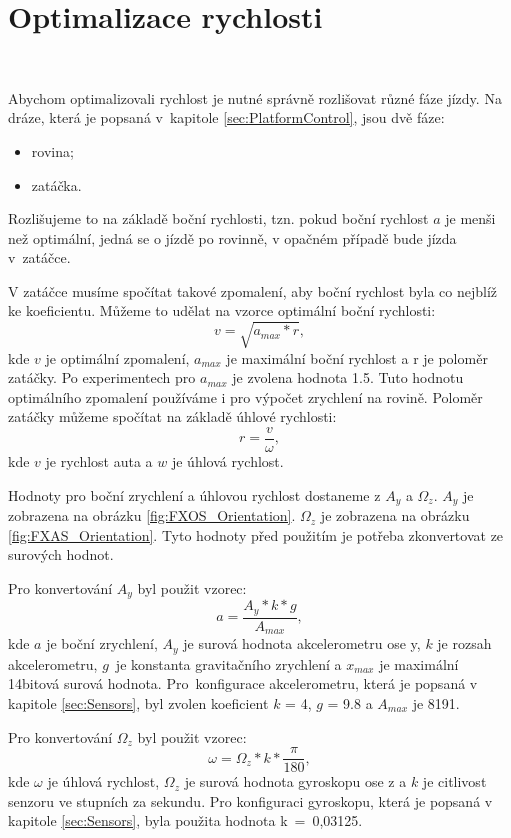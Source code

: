 \chapter{Optimalizace rychlosti}
\label{sec:SpeedOptimization}
\

Abychom optimalizovali rychlost je nutné správně rozlišovat různé fáze jízdy. Na
dráze, která je popsaná v~kapitole \ref{sec:PlatformControl}, jsou dvě fáze:
\begin{itemize}
	\item{rovina;}
	\item{zatáčka.}
\end{itemize}

Rozlišujeme to na základě boční rychlosti, tzn. pokud boční rychlost $a$ je menši než
optimální, jedná se o jízdě po rovinně, v opačném případě bude jízda v~zatáčce.

V zatáčce musíme spočítat takové zpomalení, aby boční rychlost byla
co nejblíž ke koeficientu. Můžeme to udělat na vzorce optimální boční
rychlosti:
\begin{equation}
v = \sqrt{a_{max} * r},
\end{equation}
kde $v$ je optimální zpomalení, $a_{max}$ je maximální boční rychlost a r je poloměr
zatáčky. Po experimentech pro $a_{max}$ je zvolena hodnota 1.5. Tuto hodnotu
optimálního zpomalení používáme i pro výpočet zrychlení na rovině. Poloměr zatáčky můžeme
spočítat na základě úhlové rychlosti:
\begin{equation}
r = \frac{v}{\omega},
\end{equation}
kde $v$ je rychlost auta a $w$ je úhlová rychlost.

Hodnoty pro boční zrychlení a úhlovou rychlost dostaneme z $A_y$ a $\Omega_z$. $A_y$ je
zobrazena na obrázku \ref{fig:FXOS_Orientation}. $\Omega_z$ je zobrazena na obrázku
\ref{fig:FXAS_Orientation}.
Tyto hodnoty před použitím je potřeba zkonvertovat ze surových
hodnot.

Pro konvertování $A_y$ byl použit vzorec:
\begin{equation}
a = \frac{A_y * k * g}{A_{max}},
\end{equation}
kde $a$ je boční zrychlení, $A_y$ je surová hodnota akcelerometru ose y,
$k$ je rozsah akcelerometru,  $g$~je konstanta gravitačního zrychlení a $x_{max}$ je
maximální 14bitová surová hodnota.  Pro~konfigurace akcelerometru, která je popsaná v kapitole
\ref{sec:Sensors}, byl zvolen koeficient $k$ = 4, $g$ = 9.8 a $A_{max}$ je 8191.

Pro konvertování $\Omega_z$ byl použit vzorec:
\begin{equation}
\omega = \Omega_z * k * \frac{\pi}{180},
\end{equation}
kde $\omega$ je úhlová rychlost, $\Omega_z$ je surová hodnota gyroskopu ose z
a $k$ je citlivost senzoru ve stupních za sekundu.
Pro konfiguraci gyroskopu, která je popsaná v kapitole
\ref{sec:Sensors}, byla použita hodnota k~=~0,03125.

\endinput
